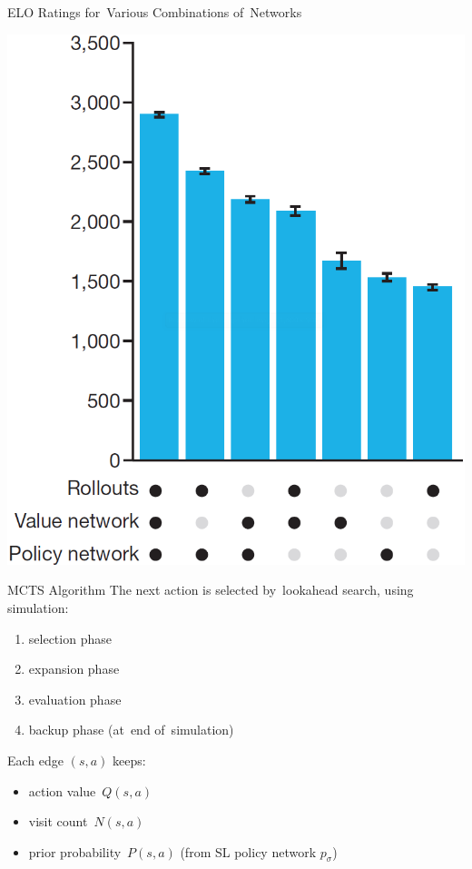 \documentclass{beamer}
\begin{document}
{    \begin{frame}{ELO Ratings for~Various Combinations of~Networks}
      \begin{center}
        \includegraphics[height=.85\textheight]{../img/ELO_ratings_various_combinations_of_ANNs.png}
      \end{center}
    \end{frame}

    \begin{frame}{MCTS Algorithm}
      The next action is selected by~lookahead search, using simulation:
      \pause
      \begin{enumerate}[<+- | alert@+>]
        \item selection phase
        \item expansion phase
        \item evaluation phase
        \item backup phase (at~end of~simulation)
      \end{enumerate}
      \pause

      Each edge $(s, a)$ keeps:
      \begin{itemize}[<+- | alert@+>]
        \item action value~$Q(s, a)$
        \item visit count~$N(s, a)$
        \item prior probability~$P(s, a)$ (from SL policy network $p_\sigma$)
      \end{itemize}
      \pause


\end{frame}}
\end{document}
